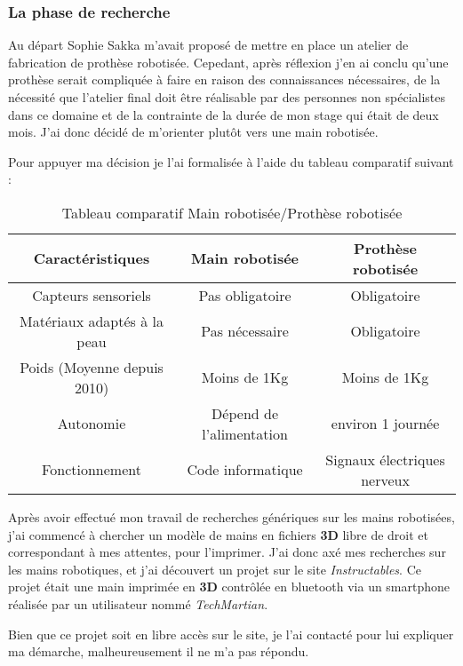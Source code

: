 \subsubsection{La phase de recherche}
Au départ Sophie Sakka m'avait proposé de mettre en place un atelier de fabrication de prothèse robotisée. Cepedant, après réflexion j'en ai conclu qu'une prothèse serait compliquée à faire en raison des connaissances nécessaires, de la nécessité que l'atelier final doit être réalisable par des personnes non spécialistes dans ce domaine et de la contrainte de la durée de mon stage qui était de deux mois. J'ai donc décidé de m'orienter plutôt vers une main robotisée. 

\vspace{0.5cm}
Pour appuyer ma décision je l'ai formalisée à l'aide du tableau comparatif suivant :

\begin{table}[!h]
    \centering
    \begin{tabular}{|c|c|c|}
        \hline Caractéristiques & Main robotisée & Prothèse robotisée  \\
         \hline Capteurs sensoriels & Pas obligatoire & Obligatoire \\
         \hline Matériaux adaptés à la peau & Pas nécessaire & Obligatoire \\
         \hline Poids (Moyenne depuis 2010) & Moins de 1Kg & Moins de 1Kg \\
         \hline Autonomie & Dépend de l'alimentation & environ 1 journée \\
         \hline Fonctionnement & Code informatique & Signaux électriques nerveux \\
         \hline
    \end{tabular}
    \caption[\, \, Comparaison Main robotisée/Prothèse robotisée]{Tableau comparatif Main robotisée/Prothèse robotisée}
    \label{tab_4.1.1.1}
\end{table}

Après avoir effectué mon travail de recherches génériques sur les mains robotisées, j'ai commencé à chercher un modèle de mains en fichiers \textbf{3D} libre de droit et correspondant à mes attentes, pour l'imprimer. J'ai donc axé mes recherches sur les mains robotiques, et j'ai découvert un projet sur le site \textit{Instructables}. Ce projet était une main imprimée en \textbf{3D} contrôlée en bluetooth via un smartphone réalisée par un utilisateur nommé \textit{TechMartian}\cite{techmartian_3d_nodate}.

\vspace{0.5cm}
Bien que ce projet soit en libre accès sur le site, je l'ai contacté pour lui expliquer ma démarche, malheureusement il ne m'a pas répondu.

